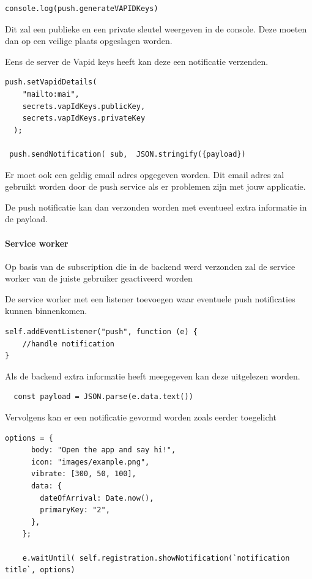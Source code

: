 \begin{lstlisting}
console.log(push.generateVAPIDKeys)
\end{lstlisting}

			Dit zal een publieke en een private sleutel weergeven in de console. Deze moeten dan op een veilige plaats opgeslagen worden.
			
			Eens de server de Vapid keys heeft kan deze een notificatie verzenden.
			
\begin{lstlisting}
push.setVapidDetails(
    "mailto:mai",
    secrets.vapIdKeys.publicKey,
    secrets.vapIdKeys.privateKey
  );
  
 push.sendNotification( sub,  JSON.stringify({payload})
\end{lstlisting}

			Er moet ook een geldig email adres opgegeven worden. Dit email adres zal gebruikt worden door de push service als er problemen zijn met jouw applicatie.
			
			De push notificatie kan dan verzonden worden met eventueel extra informatie in de payload.
			
		\paragraph{Service worker}
		
			Op basis van de subscription die in de backend werd verzonden zal de service worker van de juiste gebruiker geactiveerd worden
			
			De service worker met een listener toevoegen waar eventuele push notificaties kunnen binnenkomen.
			
\begin{lstlisting}
self.addEventListener("push", function (e) {
	//handle notification
}
\end{lstlisting}
			
			Als de backend extra informatie heeft meegegeven kan deze uitgelezen worden.
\begin{lstlisting}
  const payload = JSON.parse(e.data.text())
\end{lstlisting}
			
			Vervolgens kan er een notificatie gevormd worden zoals eerder toegelicht
			
\begin{lstlisting}
options = {
      body: "Open the app and say hi!",
      icon: "images/example.png",
      vibrate: [300, 50, 100],
      data: {
        dateOfArrival: Date.now(),
        primaryKey: "2",
      },
    };

    e.waitUntil( self.registration.showNotification(`notification title`, options)
\end{lstlisting}
			
